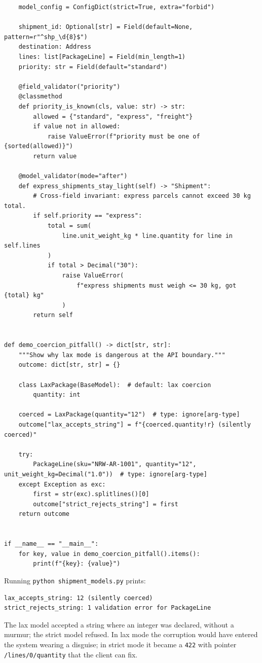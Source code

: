 \begin{verbatim}
    model_config = ConfigDict(strict=True, extra="forbid")

    shipment_id: Optional[str] = Field(default=None, pattern=r"^shp_\d{8}$")
    destination: Address
    lines: list[PackageLine] = Field(min_length=1)
    priority: str = Field(default="standard")

    @field_validator("priority")
    @classmethod
    def priority_is_known(cls, value: str) -> str:
        allowed = {"standard", "express", "freight"}
        if value not in allowed:
            raise ValueError(f"priority must be one of {sorted(allowed)}")
        return value

    @model_validator(mode="after")
    def express_shipments_stay_light(self) -> "Shipment":
        # Cross-field invariant: express parcels cannot exceed 30 kg total.
        if self.priority == "express":
            total = sum(
                line.unit_weight_kg * line.quantity for line in self.lines
            )
            if total > Decimal("30"):
                raise ValueError(
                    f"express shipments must weigh <= 30 kg, got {total} kg"
                )
        return self


def demo_coercion_pitfall() -> dict[str, str]:
    """Show why lax mode is dangerous at the API boundary."""
    outcome: dict[str, str] = {}

    class LaxPackage(BaseModel):  # default: lax coercion
        quantity: int

    coerced = LaxPackage(quantity="12")  # type: ignore[arg-type]
    outcome["lax_accepts_string"] = f"{coerced.quantity!r} (silently coerced)"

    try:
        PackageLine(sku="NRW-AR-1001", quantity="12", unit_weight_kg=Decimal("1.0"))  # type: ignore[arg-type]
    except Exception as exc:
        first = str(exc).splitlines()[0]
        outcome["strict_rejects_string"] = first
    return outcome


if __name__ == "__main__":
    for key, value in demo_coercion_pitfall().items():
        print(f"{key}: {value}")
\end{verbatim}

Running \texttt{python shipment\_models.py} prints:

\begin{verbatim}
lax_accepts_string: 12 (silently coerced)
strict_rejects_string: 1 validation error for PackageLine
\end{verbatim}

The lax model accepted a string where an integer was declared, without a
murmur; the strict model refused. In lax mode the corruption would have
entered the system wearing a disguise; in strict mode it became a
\texttt{422} with pointer \texttt{/lines/0/quantity} that the client can fix.

